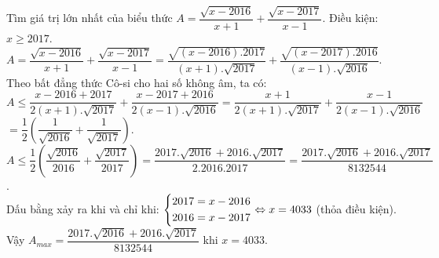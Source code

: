 \begin{ex}%
Tìm giá trị lớn nhất của biểu thức $A=\dfrac{\sqrt{x-2016}}{x+1}+\dfrac{\sqrt{x-2017}}{x-1}$.
\loigiai
    {
Điều kiện: $x \ge 2017$.\\
$A=\dfrac{\sqrt{x-2016}}{x+1}+\dfrac{\sqrt{x-2017}}{x-1}=\dfrac{\sqrt{(x-2016).2017}}{(x+1).\sqrt{2017}}+\dfrac{\sqrt{(x-2017).2016}}{(x-1).\sqrt{2016}}$.\\
Theo bất đẳng thức Cô-si cho hai số không âm, ta có:\\
$A \le \dfrac{x-2016+2017}{2(x+1).\sqrt{2017}}+\dfrac{x-2017+2016}{2(x-1).\sqrt{2016}}=\dfrac{x+1}{2(x+1).\sqrt{2017}}+\dfrac{x-1}{2(x-1).\sqrt{2016}}$ $=\dfrac{1}{2}\left(\dfrac{1}{\sqrt{2016}}+\dfrac{1}{\sqrt{2017}}\right)$.\\
$A \le \dfrac{1}{2}\left(\dfrac{\sqrt{2016}}{2016}+\dfrac{\sqrt{2017}}{2017}\right)=\dfrac{2017.\sqrt{2016}+2016.\sqrt{2017}}{2.2016.2017}=\dfrac{2017.\sqrt{2016}+2016.\sqrt{2017}}{8132544}$.\\
Dấu bằng xảy ra khi và chỉ khi: $\left\{\begin{aligned}&2017=x-2016\\&2016=x-2017\end{aligned}\right.\Leftrightarrow x=4033$ (thỏa điều kiện).\\
Vậy $A_{max}=\dfrac{2017.\sqrt{2016}+2016.\sqrt{2017}}{8132544}$ khi $x=4033$.
	}
\end{ex}

